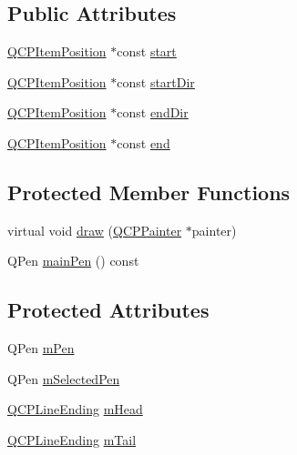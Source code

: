 \subsection*{Public Attributes}
\begin{DoxyCompactItemize}
\item 
\hyperlink{classQCPItemPosition}{Q\+C\+P\+Item\+Position} $\ast$const \hyperlink{classQCPItemCurve_a20c3b5ea31c33764f4f30c2ec7ae518b}{start}
\item 
\hyperlink{classQCPItemPosition}{Q\+C\+P\+Item\+Position} $\ast$const \hyperlink{classQCPItemCurve_aa124bf66c09cc51c627fb49db8bf8a7b}{start\+Dir}
\item 
\hyperlink{classQCPItemPosition}{Q\+C\+P\+Item\+Position} $\ast$const \hyperlink{classQCPItemCurve_a28181a9dee9cc3c3da83a883221bd2d0}{end\+Dir}
\item 
\hyperlink{classQCPItemPosition}{Q\+C\+P\+Item\+Position} $\ast$const \hyperlink{classQCPItemCurve_a24ecbb195b32a08b42b61c2cf08a1b4d}{end}
\end{DoxyCompactItemize}
\subsection*{Protected Member Functions}
\begin{DoxyCompactItemize}
\item 
virtual void \hyperlink{classQCPItemCurve_a56cb5b72cd02db2eda598274a39839a9}{draw} (\hyperlink{classQCPPainter}{Q\+C\+P\+Painter} $\ast$painter)
\item 
Q\+Pen \hyperlink{classQCPItemCurve_a8089126f5645b6edfbaddea49d1e8390}{main\+Pen} () const 
\end{DoxyCompactItemize}
\subsection*{Protected Attributes}
\begin{DoxyCompactItemize}
\item 
Q\+Pen \hyperlink{classQCPItemCurve_a7ef92988d1db2e4d0311e34c0a57fe42}{m\+Pen}
\item 
Q\+Pen \hyperlink{classQCPItemCurve_ab22cbab261b20be5aa8e4ca252149246}{m\+Selected\+Pen}
\item 
\hyperlink{classQCPLineEnding}{Q\+C\+P\+Line\+Ending} \hyperlink{classQCPItemCurve_af2cc26ff199570940dc96f5ec19a13f8}{m\+Head}
\item 
\hyperlink{classQCPLineEnding}{Q\+C\+P\+Line\+Ending} \hyperlink{classQCPItemCurve_af1dca285b97e3f5b892dab827a79f327}{m\+Tail}
\end{DoxyCompactItemize}
